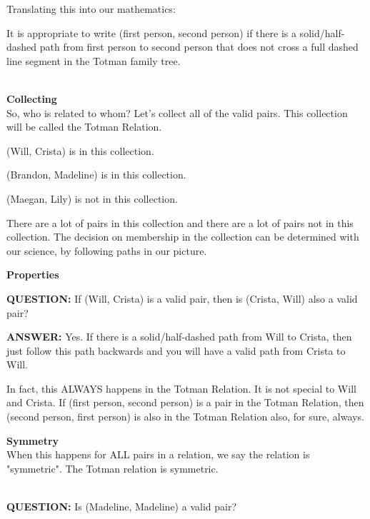 \documentclass{ximera}
\begin{document}
Translating this into our mathematics: 

\begin{explanation}
It is appropriate to write (first person, second person) if there is a solid/half-dashed path from first person to second person that does not cross a full dashed line segment in the Totman family tree. 
\end{explanation}
\quad \\



\textbf{Collecting} \\
So, who is related to whom? Let's collect all of the valid pairs.  This collection will be called the Totman Relation.

(Will, Crista) is in this collection.

(Brandon, Madeline) is in this collection.

(Maegan, Lily) is not in this collection.

There are a lot of pairs in this collection and there are a lot of pairs not in this collection. The decision on membership in the collection can be determined with our science, by following paths in our picture. 








\textbf{Properties}




\textbf{QUESTION: }If (Will, Crista) is a valid pair, then is (Crista, Will) also a valid pair?

\textbf{ANSWER:} Yes. If there is a solid/half-dashed path from Will to Crista, then just follow this path backwards and you will have a valid path from Crista to Will.

In fact, this ALWAYS happens in the Totman Relation.  It is not special to Will and Crista.
If (first person, second person) is a pair in the Totman Relation, then (second person, first person) is also in the Totman Relation also, for sure, always. 


\begin{definition} 
\textbf{Symmetry} \\
When this happens for ALL pairs in a relation, we say the relation is "symmetric".  The Totman relation is symmetric.
\end{definition}
\quad \\


\textbf{QUESTION:} Is (Madeline, Madeline) a valid pair?
\end{document}
